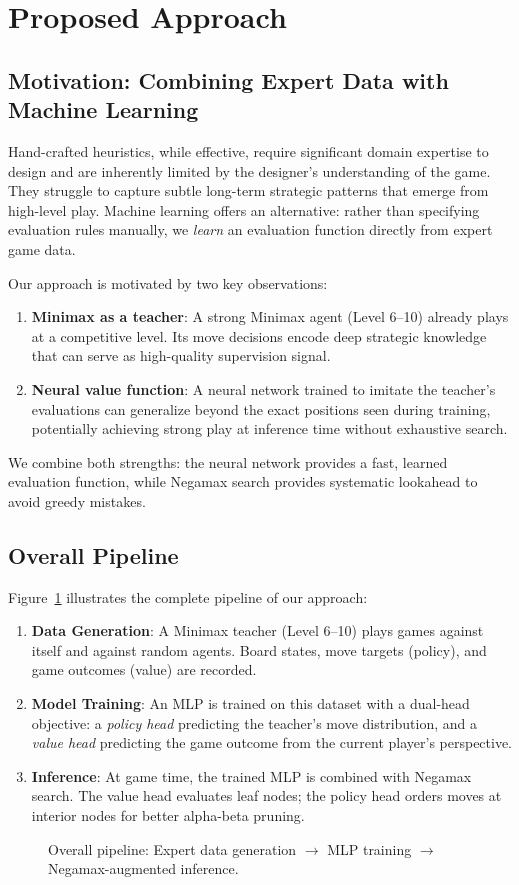 \section{Proposed Approach}

\subsection{Motivation: Combining Expert Data with Machine Learning}

Hand-crafted heuristics, while effective, require significant domain expertise to design and are inherently limited by the designer's understanding of the game. They struggle to capture subtle long-term strategic patterns that emerge from high-level play. Machine learning offers an alternative: rather than specifying evaluation rules manually, we \textit{learn} an evaluation function directly from expert game data.

Our approach is motivated by two key observations:

\begin{enumerate}
    \item \textbf{Minimax as a teacher}: A strong Minimax agent (Level 6–10) already plays at a competitive level. Its move decisions encode deep strategic knowledge that can serve as high-quality supervision signal.
    \item \textbf{Neural value function}: A neural network trained to imitate the teacher's evaluations can generalize beyond the exact positions seen during training, potentially achieving strong play at inference time without exhaustive search.
\end{enumerate}

We combine both strengths: the neural network provides a fast, learned evaluation function, while Negamax search provides systematic lookahead to avoid greedy mistakes.

\subsection{Overall Pipeline}

Figure~\ref{fig:pipeline} illustrates the complete pipeline of our approach:

\begin{enumerate}
    \item \textbf{Data Generation}: A Minimax teacher (Level 6–10) plays games against itself and against random agents. Board states, move targets (policy), and game outcomes (value) are recorded.
    \item \textbf{Model Training}: An MLP is trained on this dataset with a dual-head objective: a \textit{policy head} predicting the teacher's move distribution, and a \textit{value head} predicting the game outcome from the current player's perspective.
    \item \textbf{Inference}: At game time, the trained MLP is combined with Negamax search. The value head evaluates leaf nodes; the policy head orders moves at interior nodes for better alpha-beta pruning.
\end{enumerate}

\begin{figure}[H]
    \centering
    \caption{Overall pipeline: Expert data generation $\rightarrow$ MLP training $\rightarrow$ Negamax-augmented inference.}
    \label{fig:pipeline}
\end{figure}
